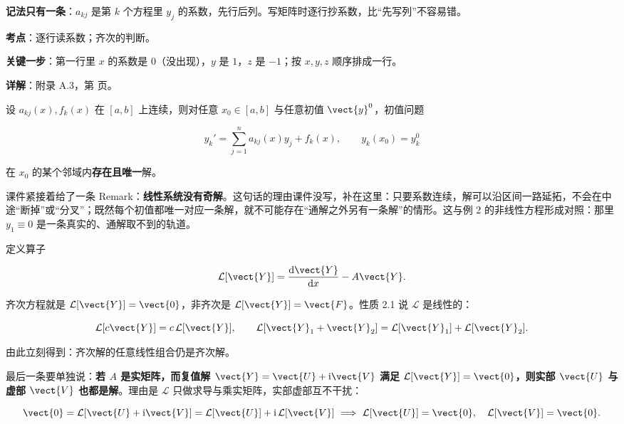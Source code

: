 \documentclass[11pt]{ctexart}
\renewcommand{\qbreak}{\needspace{0.26\textheight}}
\begin{document}
\textbf{记法只有一条}：$a_{kj}$ 是第 $k$ 个方程里 $y_j$ 的系数，先行后列。写矩阵时逐行抄系数，比“先写列”不容易错。


\qbreak
{}
\par\textbf{考点}：逐行读系数；齐次的判断。
\par\textbf{关键一步}：第一行里 $x$ 的系数是 $0$（没出现），$y$ 是 $1$，$z$ 是 $-1$；按 $x,y,z$ 顺序排成一行。
\par\textbf{详解}：附录 A.3，第 \pageref{c1:app:a3} 页。



设 $a_{kj}(x),f_k(x)$ 在 $[a,b]$ 上连续，则对任意 $x_0\in[a,b]$ 与任意初值 $\vect{y}^0$，初值问题

\[
y_k'=\sum_{j=1}^{n}a_{kj}(x)y_j+f_k(x),\qquad y_k(x_0)=y_k^0
\]

在 $x_0$ 的某个邻域内\textbf{存在且唯一}解。

课件紧接着给了一条 Remark：\textbf{线性系统没有奇解}。这句话的理由课件没写，补在这里：只要系数连续，解可以沿区间一路延拓，不会在中途“断掉”或“分叉”；既然每个初值都唯一对应一条解，就不可能存在“通解之外另有一条解”的情形。这与例 2 的非线性方程形成对照：那里 $y_1\equiv0$ 是一条真实的、通解取不到的轨道。


定义算子

\[
\mathcal{L}[\vect{Y}]=\frac{\mathrm{d}\vect{Y}}{\mathrm{d}x}-A\vect{Y}.
\]

齐次方程就是 $\mathcal{L}[\vect{Y}]=\vect{0}$，非齐次是 $\mathcal{L}[\vect{Y}]=\vect{F}$。性质 2.1 说 $\mathcal{L}$ 是线性的：

\[
\mathcal{L}[c\vect{Y}]=c\,\mathcal{L}[\vect{Y}],\qquad
\mathcal{L}[\vect{Y}_1+\vect{Y}_2]=\mathcal{L}[\vect{Y}_1]+\mathcal{L}[\vect{Y}_2].
\]

由此立刻得到：齐次解的任意线性组合仍是齐次解。

最后一条要单独说：\textbf{若 $A$ 是实矩阵，而复值解 $\vect{Y}=\vect{U}+\mathrm{i}\vect{V}$ 满足 $\mathcal{L}[\vect{Y}]=\vect{0}$，则实部 $\vect{U}$ 与虚部 $\vect{V}$ 也都是解}。理由是 $\mathcal{L}$ 只做求导与乘实矩阵，实部虚部互不干扰：

\[
\vect{0}=\mathcal{L}[\vect{U}+\mathrm{i}\vect{V}]=\mathcal{L}[\vect{U}]+\mathrm{i}\,\mathcal{L}[\vect{V}]
\ \Longrightarrow\
\mathcal{L}[\vect{U}]=\vect{0},\quad \mathcal{L}[\vect{V}]=\vect{0}.
\]
\end{document}
